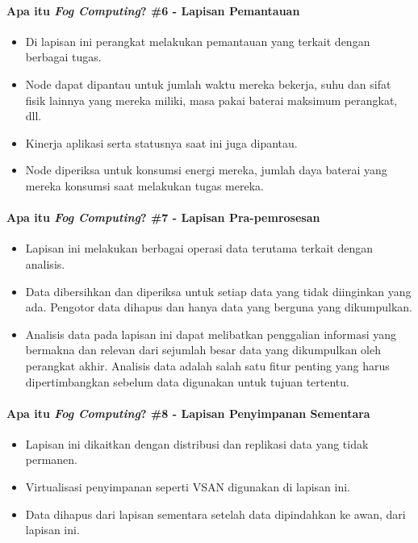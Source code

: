 \begin{frame}{\insertsectionhead}
	\framesubtitle{Apa itu \textit{Fog Computing}? \#6 - Lapisan Pemantauan}
	\justifying
	\begin{itemize}
		\item Di lapisan ini perangkat melakukan pemantauan yang terkait dengan berbagai tugas.
		\item Node dapat dipantau untuk jumlah waktu mereka bekerja, suhu dan sifat fisik lainnya yang mereka miliki, masa pakai baterai maksimum perangkat, dll.
		\item Kinerja aplikasi serta statusnya saat ini juga dipantau.
		\item Node diperiksa untuk konsumsi energi mereka, jumlah daya baterai yang mereka konsumsi saat melakukan tugas mereka.
	\end{itemize}
\end{frame}

\begin{frame}{\insertsectionhead}
	\framesubtitle{Apa itu \textit{Fog Computing}? \#7 - Lapisan Pra-pemrosesan}
	\justifying
	\begin{itemize}
		\item Lapisan ini melakukan berbagai operasi data terutama terkait dengan analisis.	
		\item Data dibersihkan dan diperiksa untuk setiap data yang tidak diinginkan yang ada. Pengotor data dihapus dan hanya data yang berguna yang dikumpulkan.
		\item Analisis data pada lapisan ini dapat melibatkan penggalian informasi yang bermakna dan relevan dari sejumlah besar data yang dikumpulkan oleh perangkat akhir. Analisis data adalah salah satu fitur penting yang harus dipertimbangkan sebelum data digunakan untuk tujuan tertentu.
	\end{itemize}
\end{frame}

\begin{frame}{\insertsectionhead}
	\framesubtitle{Apa itu \textit{Fog Computing}? \#8 - Lapisan Penyimpanan Sementara}
	\justifying
	\begin{itemize}
		\item Lapisan ini dikaitkan dengan distribusi dan replikasi data yang tidak permanen.
		\item Virtualisasi penyimpanan seperti VSAN digunakan di lapisan ini.
		\item Data dihapus dari lapisan sementara setelah data dipindahkan ke awan, dari lapisan ini.
	\end{itemize}
\end{frame}

